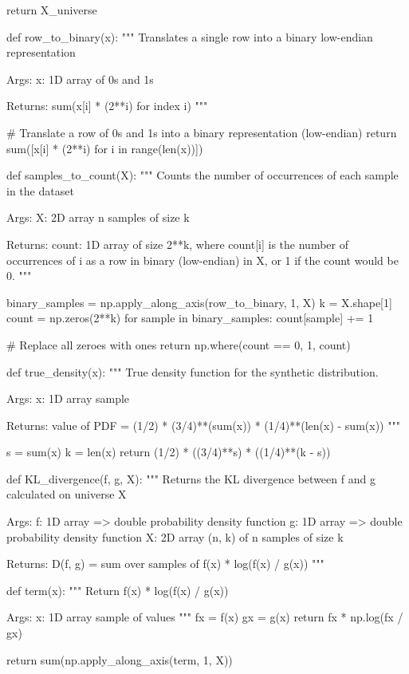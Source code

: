 \begin{python}
    return X_universe


def row_to_binary(x):
    """
    Translates a single row into a binary low-endian representation
    
    Args:
       x:  1D array of 0s and 1s
       
    Returns:
       sum(x[i] * (2**i) for index i)
    """
    
    # Translate a row of 0s and 1s into a binary representation (low-endian)
    return sum([x[i] * (2**i) for i in range(len(x))])


def samples_to_count(X):
    """
    Counts the number of occurrences of each sample in the dataset
    
    Args:
       X:   2D array  n samples of size k
       
    Returns:
       count:  1D array of size 2**k, where count[i] is the number of
               occurrences of i as a row in binary (low-endian) in X,
               or 1 if the count would be 0.
    """
    
    binary_samples = np.apply_along_axis(row_to_binary, 1, X)
    k = X.shape[1]
    count = np.zeros(2**k)
    for sample in binary_samples:
        count[sample] += 1
    
    # Replace all zeroes with ones
    return np.where(count == 0, 1, count)


def true_density(x):
    """
    True density function for the synthetic distribution.
    
    Args:
       x:  1D array  sample
       
    Returns:
       value of PDF = (1/2) * (3/4)**(sum(x)) * (1/4)**(len(x) - sum(x))
    """
    
    s = sum(x)
    k = len(x)
    return (1/2) * ((3/4)**s) * ((1/4)**(k - s))


def KL_divergence(f, g, X):
    """
    Returns the KL divergence between f and g calculated on universe X
    
    Args:
       f:  1D array => double  probability density function
       g:  1D array => double  probability density function
       X:  2D array (n, k) of n samples of size k
       
    Returns:  D(f, g) = sum over samples of f(x) * log(f(x) / g(x))
    """
    
    def term(x):
        """ 
        Return f(x) * log(f(x) / g(x)) 
        
        Args:
           x:  1D array sample of values
        """
        fx = f(x)
        gx = g(x)
        return fx * np.log(fx / gx)
    
    return sum(np.apply_along_axis(term, 1, X))
\end{python}

